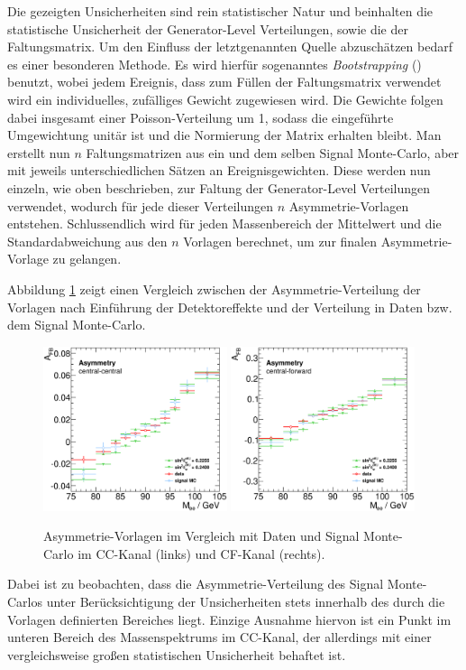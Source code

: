 Die gezeigten Unsicherheiten sind rein statistischer Natur und beinhalten die
statistische Unsicherheit der Generator-Level Verteilungen, sowie die der
Faltungsmatrix. Um den Einfluss der
letztgenannten Quelle abzuschätzen bedarf es einer besonderen Methode. Es
wird hierfür sogenanntes \textit{Bootstrapping} (\cite{zbMATH03631774})
benutzt, wobei jedem Ereignis, dass zum Füllen der Faltungsmatrix verwendet
wird ein individuelles, zufälliges Gewicht zugewiesen wird. Die Gewichte
folgen dabei insgesamt einer Poisson-Verteilung um 1, sodass die eingeführte
Umgewichtung unitär ist und die Normierung der Matrix erhalten bleibt. Man
erstellt nun $n$ Faltungsmatrizen aus ein und dem selben Signal Monte-Carlo,
aber mit jeweils unterschiedlichen Sätzen an Ereignisgewichten.
Diese werden nun einzeln, wie oben beschrieben, zur Faltung der Generator-Level
Verteilungen verwendet, wodurch für jede dieser Verteilungen $n$
Asymmetrie-Vorlagen entstehen. Schlussendlich wird für jeden Massenbereich der
Mittelwert und die Standardabweichung aus den $n$ Vorlagen berechnet, um zur
finalen Asymmetrie-Vorlage zu gelangen.

Abbildung \ref{fig:afb_comp} zeigt einen Vergleich zwischen der
Asymmetrie-Verteilung der Vorlagen nach Einführung der Detektoreffekte und
der Verteilung in Daten bzw. dem Signal Monte-Carlo.
\begin{figure}
    \centering
    \includegraphics[width=0.48\textwidth]{plots/afb_comp_cc}
    \hfill
    \includegraphics[width=0.48\textwidth]{plots/afb_comp_cf}
    \caption[Asymmetrie-Vorlagen im Vergleich mit Daten und Signal Monte-Carlo]
        {Asymmetrie-Vorlagen im Vergleich mit Daten und Signal Monte-Carlo im
        \ac{CC}-Kanal (links) und  \ac{CF}-Kanal (rechts).}
    \label{fig:afb_comp}
\end{figure}
Dabei ist zu beobachten, dass die Asymmetrie-Verteilung des Signal Monte-Carlos
unter Berücksichtigung der Unsicherheiten stets innerhalb des durch die
Vorlagen definierten Bereiches liegt. Einzige Ausnahme hiervon ist ein Punkt im
unteren Bereich des Massenspektrums im CC-Kanal, der allerdings mit einer
vergleichsweise großen statistischen Unsicherheit behaftet ist.

